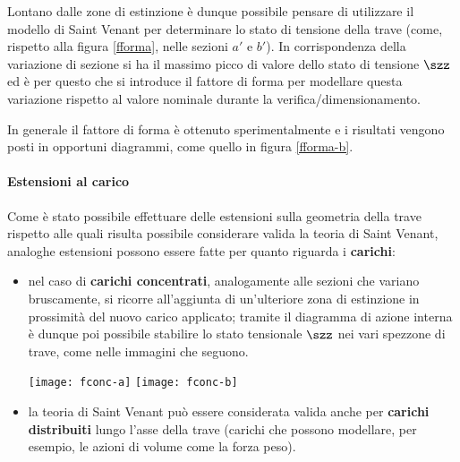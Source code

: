 		
		Lontano dalle zone di estinzione è dunque possibile pensare di utilizzare il modello di Saint Venant per determinare lo stato di tensione della trave (come, rispetto alla figura \ref{fforma}, nelle sezioni $a'$ e $b'$). In corrispondenza della variazione di sezione si ha il massimo picco di valore dello stato di tensione $\szz$ ed è per questo che si introduce il fattore di forma per modellare questa variazione rispetto al valore nominale durante la verifica/dimensionamento.
		
		In generale il fattore di forma è ottenuto sperimentalmente e i risultati vengono posti in opportuni diagrammi, come quello in figura \ref{fforma-b}.
		
		
		
		\paragraph{Estensioni al carico} Come è stato possibile effettuare delle estensioni sulla geometria della trave rispetto alle quali risulta possibile considerare valida la teoria di Saint Venant, analoghe estensioni possono essere fatte per quanto riguarda i \textbf{carichi}:
		\begin{itemize}
			\item nel caso di \textbf{carichi concentrati}, analogamente alle sezioni che variano bruscamente, si ricorre all'aggiunta di un'ulteriore zona di estinzione in prossimità del nuovo carico applicato; tramite il diagramma di azione interna è dunque poi possibile stabilire lo stato tensionale $\szz$ nei vari spezzone di trave, come nelle immagini che seguono.
			\begin{center}
				\texttt{[image: fconc-a]}
				\texttt{[image: fconc-b]}
			\end{center}
			
			\item la teoria di Saint Venant può essere considerata valida anche per \textbf{carichi distribuiti} lungo l'asse della trave (carichi che possono modellare, per esempio, le azioni di volume come la forza peso).
		\end{itemize}
		
